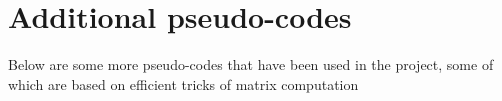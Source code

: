 \documentclass{article}
\begin{document}



\section{Additional pseudo-codes}
Below are some more pseudo-codes that have been used in the project, some of which are based on efficient tricks of matrix computation
\end{document}
